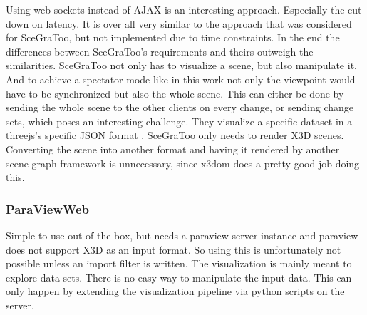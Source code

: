 Using web sockets instead of AJAX is an interesting approach.
\cite{Marion:2012:RCS:2338714.2338721} Especially the cut down on latency. It is
over all very similar to the approach that was considered for SceGraToo, but not
implemented due to time constraints. In the end the differences between
SceGraToo's requirements and theirs outweigh the similarities. \gls{SceGraToo} not only
has to visualize a scene, but also manipulate it. And to achieve a spectator mode
like in this work not only the viewpoint would have to be synchronized but also
the whole scene. This can either be done by sending the whole scene to the other
clients on every change, or sending change sets, which poses an interesting
challenge. They visualize a specific dataset in a threejs's specific \gls{JSON} format
\cite{threejs-format}. \gls{SceGraToo} only needs to render \gls{X3D} scenes. Converting the
scene into another format and having it rendered by another scene graph framework
is unnecessary, since x3dom does a pretty good job doing this.

\subsubsection{ParaViewWeb}
\label{paraviewweb-pvweb}

Simple to use out of the box, but needs a paraview server instance and
paraview does not support \gls{X3D} as an input format. So using this is unfortunately
not possible unless an import filter is written. The visualization is
mainly meant to explore data sets. There is no easy way to manipulate
the input data. This can only happen by extending the visualization
pipeline via python scripts on the server.
